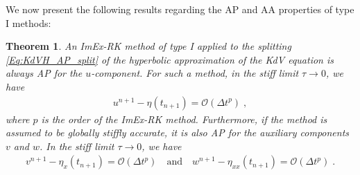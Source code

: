 \documentclass{article}
\newcommand{\ukdv}{\eta}
\newtheorem{thm}{Theorem}
\begin{document}
We now present the following results regarding the AP and AA properties of type I methods:
\begin{thm}\label{Th:AP_result_type_I}
    An ImEx-RK method of type I applied to the splitting \eqref{Eq:KdVH_AP_split} of the hyperbolic approximation of the KdV
    equation is always AP for the $u$-component. For such a method, in the stiff limit $\tau \to 0$, we have
    \begin{align}
        u^{n+1} - \ukdv(t_{n+1}) = \mathcal{O}(\Delta t^p) \;,
    \end{align}
    where $p$ is the order of the ImEx-RK method.
    Furthermore, if the method is assumed to be globally stiffly accurate, it is also AP for the auxiliary components $v$ and $w$.
    In the stiff limit $\tau \to 0$, we have
    \begin{align}
        v^{n+1} - \ukdv_x(t_{n+1}) = \mathcal{O}(\Delta t^p) \quad \text{and} \quad w^{n+1} - \ukdv_{xx}(t_{n+1}) = \mathcal{O}(\Delta t^p)\;.
    \end{align}
\end{thm}
\end{document}
